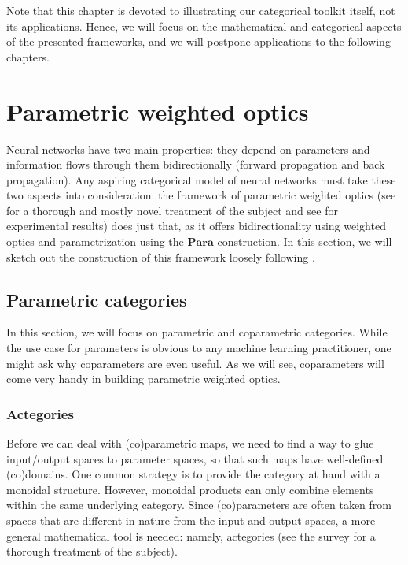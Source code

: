 \documentclass[12pt,a4paper,openright,twoside]{report}
\theoremstyle{plain}
\theoremstyle{definition}
\begin{document}
Note that this chapter is devoted to illustrating our categorical toolkit itself, not its applications. Hence, we will focus on the mathematical and categorical aspects of the presented frameworks, and we will postpone applications to the following chapters.


\section{Parametric weighted optics}

Neural networks have two main properties: they depend on parameters and information flows through them bidirectionally (forward propagation and back propagation). Any aspiring categorical model of neural networks must take these two aspects into consideration: the framework of parametric weighted optics (see \cite{gavranovic2024fundamental} for a thorough and mostly novel treatment of the subject and see \cite{cruttwell2022categorical} for experimental results) does just that, as it offers bidirectionality using weighted optics and parametrization using the $\mathbf{Para}$ construction.
In this section, we will sketch out the construction of this framework loosely following \cite{gavranovic2024fundamental}.

\subsection{Parametric categories}

In this section, we will focus on parametric and coparametric categories. While the use case for parameters is obvious to any machine learning practitioner, one might ask why coparameters are even useful. As we will see, coparameters will come very handy in building parametric weighted optics.


\subsubsection{Actegories}

Before we can deal with (co)parametric maps, we need to find a way to glue input/output spaces to parameter spaces, so that such maps have well-defined (co)domains. One common strategy is to provide the category at hand with a monoidal structure. However, monoidal products can only combine elements within the same underlying category. Since (co)parameters are often taken from spaces that are different in nature from the input and output spaces, a more general mathematical tool is needed: namely, actegories (see the survey \cite{capucci2022actegories} for a thorough treatment of the subject). 
\end{document}
